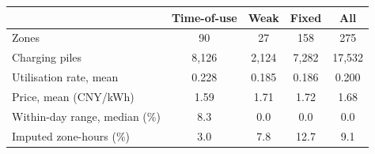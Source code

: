 \begin{table}
{\tblfont
\begin{tabular*}{\linewidth}{@{\extracolsep{\fill}}lcccc@{}}
\toprule
 & Time-of-use & Weak & Fixed & All \\
\midrule
Zones & 90 & 27 & 158 & 275 \\
Charging piles & 8{,}126 & 2{,}124 & 7{,}282 & 17{,}532 \\
Utilisation rate, mean & 0.228 & 0.185 & 0.186 & 0.200 \\
Price, mean (CNY/kWh) & 1.59 & 1.71 & 1.72 & 1.68 \\
Within-day range, median (\%) & 8.3 & 0.0 & 0.0 & 0.0 \\
Imputed zone-hours (\%) & 3.0 & 7.8 & 12.7 & 9.1 \\
\bottomrule
\end{tabular*}\par}
\end{table}
